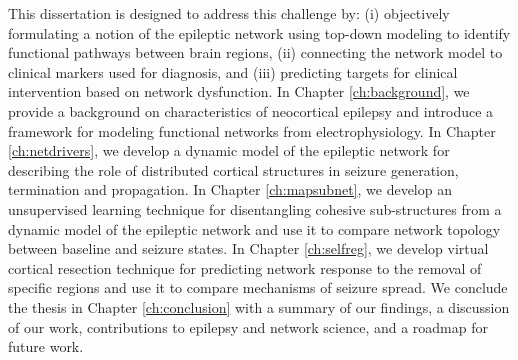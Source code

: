 This dissertation is designed to address this challenge by: (i) objectively formulating a notion of the epileptic network using top-down modeling to identify functional pathways between brain regions, (ii) connecting the network model to clinical markers used for diagnosis, and (iii) predicting targets for clinical intervention based on network dysfunction. In Chapter \ref{ch:background}, we provide a background on characteristics of neocortical epilepsy and introduce a framework for modeling functional networks from electrophysiology. In Chapter \ref{ch:netdrivers}, we develop a dynamic model of the epileptic network for describing the role of distributed cortical structures in seizure generation, termination and propagation. In Chapter \ref{ch:mapsubnet}, we develop an unsupervised learning technique for disentangling cohesive sub-structures from a dynamic model of the epileptic network and use it to compare network topology between baseline and seizure states. In Chapter \ref{ch:selfreg}, we develop virtual cortical resection technique for predicting network response to the removal of specific regions and use it to compare mechanisms of seizure spread. We conclude the thesis in Chapter \ref{ch:conclusion} with a summary of our findings, a discussion of our work, contributions to epilepsy and network science, and a roadmap for future work.



